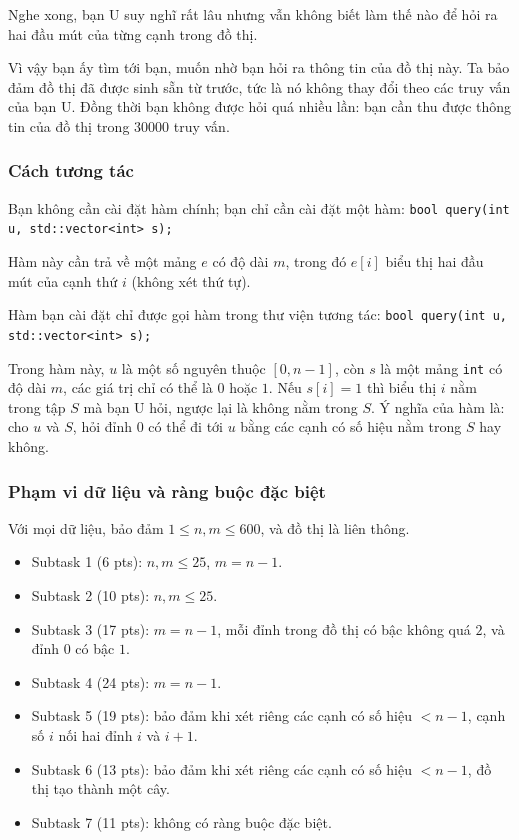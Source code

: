 \documentclass[11pt]{article}
\begin{document}
Nghe xong, bạn U suy nghĩ rất lâu nhưng vẫn không biết làm thế nào để hỏi ra
hai đầu mút của từng cạnh trong đồ thị.

Vì vậy bạn ấy tìm tới bạn, muốn nhờ bạn hỏi ra thông tin của đồ thị này. Ta bảo
đảm đồ thị đã được sinh sẵn từ trước, tức là nó không thay đổi theo các truy
vấn của bạn U. Đồng thời bạn không được hỏi quá nhiều lần: bạn cần thu được
thông tin của đồ thị trong \(30000\) truy vấn.

\subsubsection{Cách tương tác}

Bạn không cần cài đặt hàm chính; bạn chỉ cần cài đặt một hàm:
\texttt{bool query(int u, std::vector<int> s);}

Hàm này cần trả về một mảng \(e\) có độ dài \(m\), trong đó \(e[i]\) biểu thị
hai đầu mút của cạnh thứ \(i\) (không xét thứ tự).

Hàm bạn cài đặt chỉ được gọi hàm trong thư viện tương tác:
\texttt{bool query(int u, std::vector<int> s);}

Trong hàm này, \(u\) là một số nguyên thuộc \([0,n-1]\), còn \(s\) là một mảng
\texttt{int} có độ dài \(m\), các giá trị chỉ có thể là \(0\) hoặc \(1\). Nếu
\(s[i]=1\) thì biểu thị \(i\) nằm trong tập \(S\) mà bạn U hỏi, ngược lại là
không nằm trong \(S\). Ý nghĩa của hàm là: cho \(u\) và \(S\), hỏi đỉnh \(0\)
có thể đi tới \(u\) bằng các cạnh có số hiệu nằm trong \(S\) hay không.

\subsubsection{Phạm vi dữ liệu và ràng buộc đặc biệt}

Với mọi dữ liệu, bảo đảm \(1\le n,m\le 600\), và đồ thị là liên thông.

\begin{itemize}
  \item Subtask 1 (6 pts): \(n,m\le 25\), \(m=n-1\).
  \item Subtask 2 (10 pts): \(n,m\le 25\).
  \item Subtask 3 (17 pts): \(m=n-1\), mỗi đỉnh trong đồ thị có bậc không quá
  \(2\), và đỉnh \(0\) có bậc \(1\).
  \item Subtask 4 (24 pts): \(m=n-1\).
  \item Subtask 5 (19 pts): bảo đảm khi xét riêng các cạnh có số hiệu
  \(<n-1\), cạnh số \(i\) nối hai đỉnh \(i\) và \(i+1\).
  \item Subtask 6 (13 pts): bảo đảm khi xét riêng các cạnh có số hiệu
  \(<n-1\), đồ thị tạo thành một cây.
  \item Subtask 7 (11 pts): không có ràng buộc đặc biệt.
\end{itemize}
\end{document}
